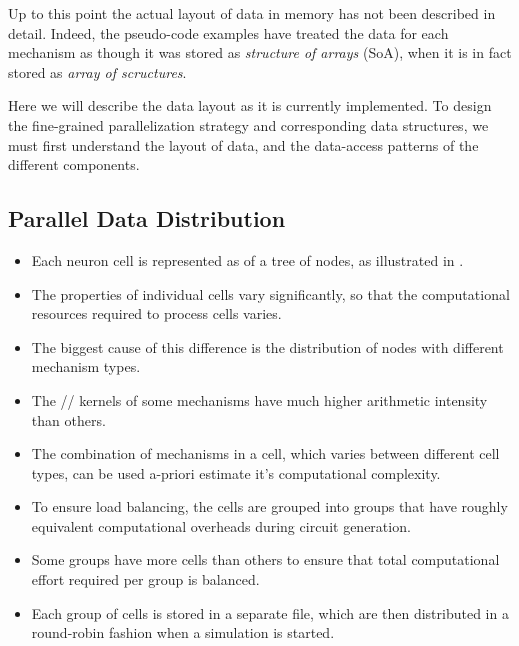 Up to this point the actual layout of data in memory has not been described in detail. Indeed, the pseudo-code examples have treated the data for each mechanism as though it was stored as \emph{structure of arrays} (SoA), when it is in fact stored as \emph{array of scructures}.

Here we will describe the data layout as it is currently implemented. To design the fine-grained parallelization strategy and corresponding data structures, we must first understand the layout of data, and the data-access patterns of the different components.

\subsection{Parallel Data Distribution}

\begin{itemize}
\item
    Each neuron cell is represented as of a tree of nodes, as illustrated in .
\item
    The properties of individual cells vary significantly, so that the computational resources required to process cells varies.
\item
    The biggest cause of this difference is the distribution of nodes with different mechanism types.
\item
    The // kernels of some mechanisms have much higher arithmetic intensity than others.
\item
    The combination of mechanisms in a cell, which varies between different cell types, can be used a-priori estimate it's computational complexity.
\end{itemize}

\begin{itemize}
\item
    To ensure load balancing, the cells are grouped into groups that have roughly equivalent computational overheads during circuit generation.
\item
    Some groups have more cells than others to ensure that total computational effort required per group is balanced.
\item
    Each group of cells is stored in a separate  file, which are then distributed in a round-robin fashion when a \neuron simulation is started.
\end{itemize}

